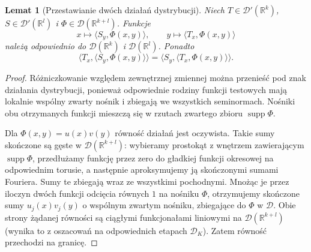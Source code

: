 \documentclass[11pt,a4paper]{article}
\numberwithin{equation}{section}
\theoremstyle{plain}
\newtheorem{lemat}[twierdzenie]{Lemat}
\theoremstyle{definition}
\theoremstyle{remark}
\newcommand{\R}{\mathbb R}
\DeclareMathOperator{\supp}{supp}
\begin{document}
\begin{lemat}[Przestawianie dwóch działań dystrybucji]
\label{lem:iterated-distributions21}
Niech $T\in\mathcal D'(\R^k)$,
$S\in\mathcal D'(\R^l)$ i
$\Phi\in\mathcal D(\R^{k+l})$. Funkcje
\[
 x\longmapsto\langle S_y,\Phi(x,y)\rangle,
 \qquad
 y\longmapsto\langle T_x,\Phi(x,y)\rangle
\]
należą odpowiednio do $\mathcal D(\R^k)$ i
$\mathcal D(\R^l)$. Ponadto
\[
 \langle T_x,\langle S_y,\Phi(x,y)\rangle\rangle
 =\langle S_y,\langle T_x,\Phi(x,y)\rangle\rangle.
\]
\end{lemat}
\begin{proof}
Różniczkowanie względem zewnętrznej zmiennej można
przenieść pod znak działania dystrybucji, ponieważ
odpowiednie rodziny funkcji testowych mają lokalnie wspólny
zwarty nośnik i zbiegają we wszystkich seminormach.
Nośniki obu otrzymanych funkcji mieszczą się w rzutach
zwartego zbioru $\supp\Phi$.

Dla $\Phi(x,y)=u(x)v(y)$ równość działań jest oczywista.
Takie sumy skończone są gęste w $\mathcal D(\R^{k+l})$:
wybieramy prostokąt z wnętrzem zawierającym $\supp\Phi$,
przedłużamy funkcję przez zero do gładkiej funkcji okresowej
na odpowiednim torusie, a następnie aproksymujemy ją
skończonymi sumami Fouriera. Sumy te zbiegają wraz ze
wszystkimi pochodnymi. Mnożąc je przez iloczyn dwóch
funkcji odcięcia równych $1$ na nośniku $\Phi$,
otrzymujemy skończone sumy $u_j(x)v_j(y)$ o wspólnym
zwartym nośniku, zbiegające do $\Phi$ w $\mathcal D$.
Obie strony żądanej równości są ciągłymi funkcjonałami
liniowymi na $\mathcal D(\R^{k+l})$ (wynika to z
oszacowań na odpowiednich etapach $\mathcal D_K$).
Zatem równość przechodzi na granicę.
\end{proof}
\end{document}
